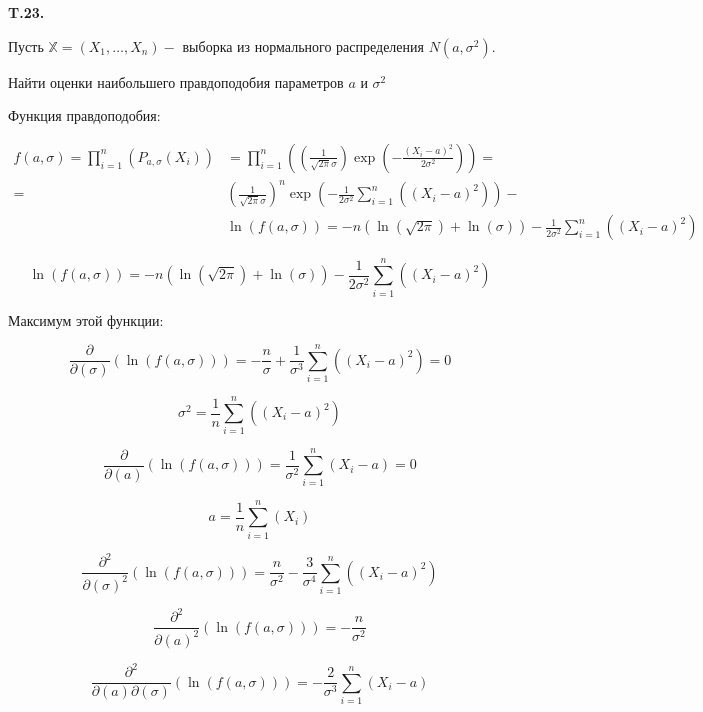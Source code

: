 \documentclass[a4paper,12pt]{article} %
\begin{document}
\begin{example} \textbf{T.23.} 


Пусть $\mathbb{X}=\left(X_{1}, \ldots, X_{n}\right)-$ выборка из нормального распределения $N\left(a, \sigma^{2}\right) .$ 

Найти оценки наибольшего правдоподобия параметров $a$ и $\sigma^{2}$





Функция правдоподобия:

$$\begin{aligned} f(a, \sigma)
=
\prod_{i=1}^{n}\left(P_{a, \sigma}\left(X_{i}\right)\right) 
&=
\prod_{i=1}^{n}\left(
\left(\frac{1}{\sqrt{2 \pi} \sigma}\right) 
\exp \left(-\frac{\left(X_{i}-a\right)^{2}}{2 \sigma^{2}} \right)
\right)=
\\
=&
\left(\frac{1}{\sqrt{2 \pi} \sigma}\right)^{n} \exp \left(-\frac{1}{2 \sigma^{2}} \sum_{i=1}^{n}\left(\left(X_{i}-a\right)^{2}\right)\right)-
\\ 
& \ln (f(a, \sigma))
=
-n(\ln (\sqrt{2 \pi})+\ln (\sigma))-\frac{1}{2 \sigma^{2}} \sum_{i=1}^{n}\left(\left(X_{i}-a\right)^{2}\right) \end{aligned}$$



$$
\ln (f(a, \sigma))
=
-n(\ln (\sqrt{2 \pi})+\ln (\sigma))-\frac{1}{2 \sigma^{2}} \sum_{i=1}^{n}\left(\left(X_{i}-a\right)^{2}\right)
$$

Максимум этой функции:




$$
\frac{\partial}{\partial(\sigma)}(\ln (f(a, \sigma)))=-\frac{n}{\sigma}+\frac{1}{\sigma^{3}} \sum_{i=1}^{n}\left(\left(X_{i}-a\right)^{2}\right)=0
$$


$$
\sigma^{2}=\frac{1}{n} \sum_{i=1}^{n}\left(\left(X_{i}-a\right)^{2}\right)
$$



$$
\frac{\partial}{\partial(a)}(\ln (f(a, \sigma)))=\frac{1}{\sigma^{2}} \sum_{i=1}^{n}\left(X_{i}-a\right)=0
$$


$$
a=\frac{1}{n} \sum_{i=1}^{n}\left(X_{i}\right)
$$


$$
\frac{\partial^{2}}{\partial(\sigma)^{2}}(\ln (f(a, \sigma)))=\frac{n}{\sigma^{2}}-\frac{3}{\sigma^{4}} \sum_{i=1}^{n}\left(\left(X_{i}-a\right)^{2}\right)
$$


$$
\frac{\partial^{2}}{\partial(a)^{2}}(\ln (f(a, \sigma)))=-\frac{n}{\sigma^{2}}
$$



$$
\frac{\partial^{2}}{\partial(a) \partial(\sigma)}(\ln (f(a, \sigma)))=-\frac{2}{\sigma^{3}} \sum_{i=1}^{n}\left(X_{i}-a\right)
$$



\end{example}
\end{document}
